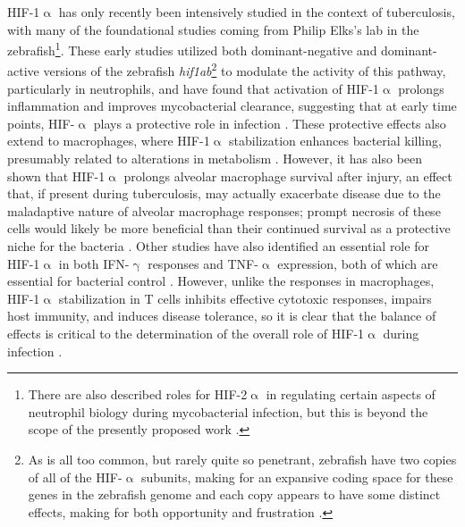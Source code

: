 HIF-1$\upalpha$ has only recently been intensively studied in the context of tuberculosis, with many of the foundational studies coming from Philip Elks's lab in the zebrafish\footnote{There are also described roles for HIF\hyp{}2$\upalpha$ in regulating certain aspects of neutrophil biology during mycobacterial infection, but this is beyond the scope of the presently proposed work \citep{Thompson2014, Elks2015}.}. These early studies utilized both dominant\hyp{}negative and dominant\hyp{}active versions of the zebrafish \textit{hif1ab}\footnote{As is all too common, but rarely quite so penetrant, zebrafish have two copies of all of the HIF\hyp{}$\upalpha$ subunits, making for an expansive coding space for these genes in the zebrafish genome and each copy appears to have some distinct effects, making for both opportunity and frustration \citep{Elks2015}.} to modulate the activity of this pathway, particularly in neutrophils, and have found that activation of HIF\hyp{}1$\upalpha$ prolongs inflammation and improves mycobacterial clearance, suggesting that at early time points, HIF\hyp{}$\upalpha$ plays a protective role in infection \citep{Elks2011, Elks2013, Hammond2020}. These protective effects also extend to macrophages, where HIF-1$\upalpha$ stabilization enhances bacterial killing, presumably related to alterations in metabolism \citep{Knight2018, Zenk2021}. However, it has also been shown that HIF-1$\upalpha$ prolongs alveolar macrophage survival after injury, an effect that, if present during tuberculosis, may actually exacerbate disease due to the maladaptive nature of alveolar macrophage responses; prompt necrosis of these cells would likely be more beneficial than their continued survival as a protective niche for the bacteria \citep{Woods2022, Leemans2001}. Other studies have also identified an essential role for HIF-1$\upalpha$ in both IFN-$\upgamma$ responses and TNF-$\upalpha$ expression, both of which are essential for bacterial control \citep{Braverman2016, Lewis2019, Flynn1993, Flynn1995}. However, unlike the responses in macrophages, HIF-1$\upalpha$ stabilization in T cells inhibits effective cytotoxic responses, impairs host immunity, and induces disease tolerance, so it is clear that the balance of effects is critical to the determination of the overall role of HIF-1$\upalpha$ during infection \citep{Liu2022b, Tzelepis2018}.

